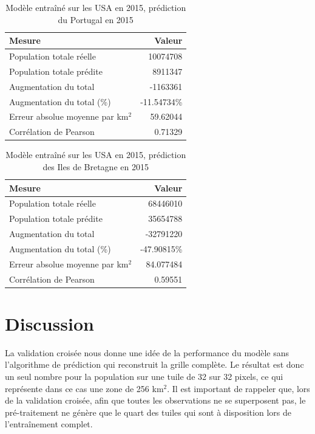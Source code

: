 \documentclass[a4paper, 11pt]{report}
\begin{document}
\begin{table}
	\centering
	\caption{Modèle entraîné sur les USA en 2015, prédiction du Portugal en 2015}
	\begin{tabular}{ l r }
		\hline
		\textbf{Mesure} & \textbf{Valeur} \\
		\hline\hline
		Population totale réelle & 10074708 \\
		\hline
		Population totale prédite & 8911347 \\
		\hline
		Augmentation du total & -1163361 \\
		\hline
		Augmentation du total (\%) & -11.54734\% \\
		\hline
		Erreur absolue moyenne par km$^2$ & 59.62044 \\
		\hline
		Corrélation de Pearson & 0.71329 \\
		\hline
	\end{tabular}
	\label{stats-usa-portugal}
\end{table}

\begin{table}
	\centering
	\caption{Modèle entraîné sur les USA en 2015, prédiction des Iles de Bretagne en 2015}
	\begin{tabular}{ l r }
		\hline
		\textbf{Mesure} & \textbf{Valeur} \\
		\hline\hline
		Population totale réelle & 68446010 \\
		\hline
		Population totale prédite & 35654788 \\
		\hline
		Augmentation du total & -32791220 \\
		\hline
		Augmentation du total (\%) & -47.90815\% \\
		\hline
		Erreur absolue moyenne par km$^2$ & 84.077484 \\
		\hline
		Corrélation de Pearson & 0.59551 \\
		\hline
	\end{tabular}
	\label{stats-usa-britishislands}
\end{table}

\section{Discussion}
La validation croisée nous donne une idée de la performance du modèle sans l'algorithme de prédiction qui reconstruit la grille complète. Le résultat est donc un seul nombre pour la population sur une tuile de 32 sur 32 pixels, ce qui représente dans ce cas une zone de 256 km$^2$. Il est important de rappeler que, lors de la validation croisée, afin que toutes les observations ne se superposent pas, le pré-traitement ne génère que le quart des tuiles qui sont à disposition lors de l'entraînement complet.
\end{document}
